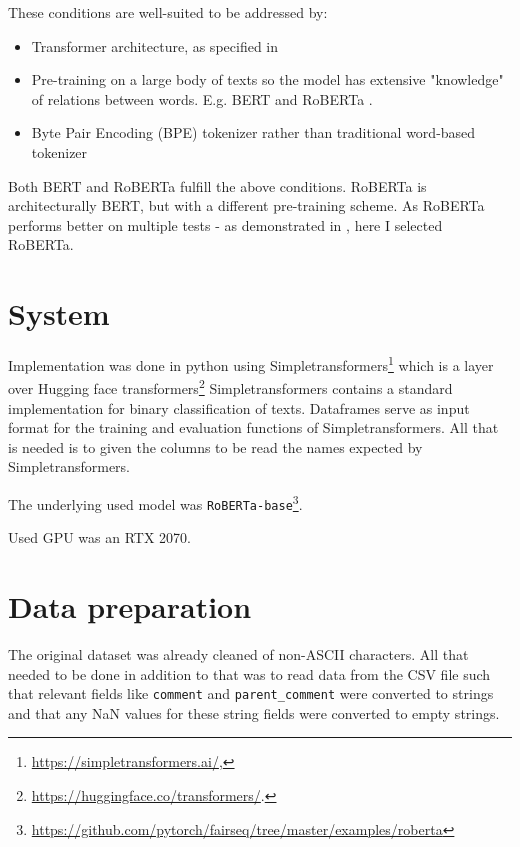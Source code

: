 \documentclass[11pt,a4paper]{article}
\begin{document}
These conditions are well-suited to be addressed by:
\begin{itemize}
\item{Transformer architecture,  as specified in \cite{NIPS2017_3f5ee243}}
\item{Pre-training on a large body of texts so the model has extensive "knowledge" of relations between words. E.g. BERT \cite{devlin2019bert} and RoBERTa \cite{liu2019roberta}.}
\item{Byte Pair Encoding (BPE) tokenizer rather than traditional word-based tokenizer}
\end{itemize}

Both BERT and RoBERTa fulfill the above conditions. RoBERTa is architecturally BERT, but with a different pre-training scheme. As RoBERTa performs better on multiple tests - as demonstrated in \cite{liu2019roberta}, here I selected RoBERTa.


\section{System}

Implementation was done in python using Simpletransformers\footnote{\url{https://simpletransformers.ai/},} which is a layer over Hugging face transformers\footnote{\url{https://huggingface.co/transformers/}.} Simpletransformers contains a standard implementation for binary classification of texts. Dataframes serve as input format for the training and evaluation functions of Simpletransformers. All that is needed is to given the columns to be read the names expected by Simpletransformers.\par

The underlying used model was \texttt{RoBERTa-base}\footnote{\url{https://github.com/pytorch/fairseq/tree/master/examples/roberta}}.\par 

Used GPU was an RTX 2070. \par


\section{Data preparation}

The original dataset was already cleaned of  non-ASCII characters. All that needed to be done in addition to that was to read data from the CSV file such that relevant fields like \texttt{comment} and \texttt{parent\_comment} were converted to strings and that any NaN values for these string fields were converted to empty strings.\par
\end{document}

